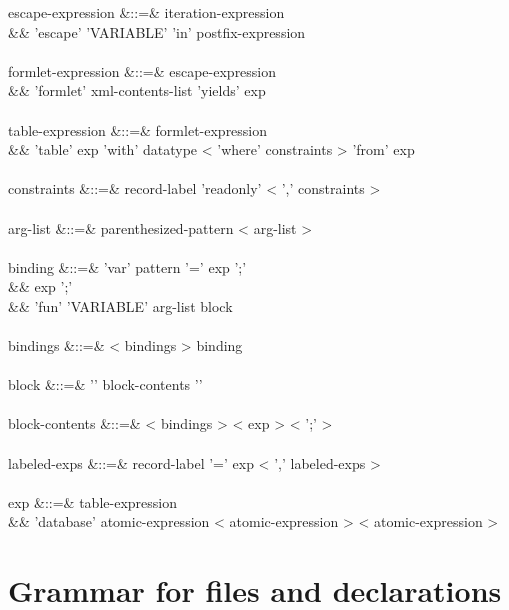 \documentclass[11pt,a4paper]{article}
\begin{document}
\begin{grammar}
escape-expression &::=& iteration-expression \\
&&                      'escape' 'VARIABLE' 'in' postfix-expression \\
\\
formlet-expression &::=& escape-expression \\
&&                       'formlet' xml-contents-list 'yields' exp \\
\\
table-expression &::=&  formlet-expression \\
&&                      'table' exp 'with' datatype < 'where' constraints > 'from' exp \\
\\
constraints &::=& record-label 'readonly' < ',' constraints > \\
\\
arg-list &::=& parenthesized-pattern < arg-list >  \\
\\
binding &::=& 'var' pattern '=' exp ';' \\
&&            exp ';' \\
&&            'fun' 'VARIABLE' arg-list block \\
\\
bindings &::=& < bindings > binding \\
\\
block &::=& '{' block-contents '}' \\
\\
block-contents &::=& < bindings > < exp > < ';' >  \\
\\
labeled-exps &::=& record-label '=' exp < ',' labeled-exps > \\
\\
exp &::=& table-expression \\
&&        'database' atomic-expression < atomic-expression > < atomic-expression >  \\
\end{grammar} 

\section{Grammar for files and declarations}
\end{document}
